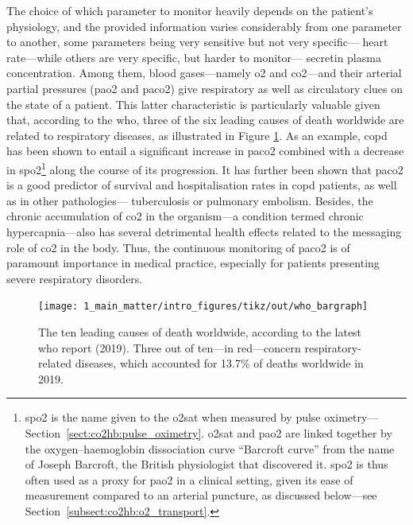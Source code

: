 
The choice of which parameter to monitor heavily depends on the patient's physiology, and the provided information varies considerably from one parameter to another, some parameters being very sensitive but not very specific---\eg{} heart rate---while others are very specific, but harder to monitor---\eg{} secretin plasma concentration. Among them, blood gases---namely \gls{o2} and \gls{co2}---and their arterial partial pressures (\gls{pao2} and \gls{paco2}) give respiratory as well as circulatory clues on the state of a patient\cite{wagner2015}. This latter characteristic is particularly valuable given that, according to the \gls{who}, three of the six leading causes of death worldwide are related to respiratory diseases, as illustrated in Figure \ref{fig:who_causes_death}. As an example, \gls{copd} has been shown to entail a significant increase in \gls{paco2} combined with a decrease in \gls{spo2}\footnote{\gls{spo2} is the name given to the \gls{o2sat} when measured by pulse oximetry---Section~\ref{sect:co2hb:pulse_oximetry}. \gls{o2sat} and \gls{pao2} are linked together by the oxygen–haemoglobin dissociation curve \aka{} \enquote{Barcroft curve} from the name of Joseph Barcroft, the British physiologist that discovered it\cite{barcroft1909}. \gls{spo2} is thus often used as a proxy for \gls{pao2} in a clinical setting, given its ease of measurement compared to an arterial puncture\cite{nitzan2014, jubran2015, tamura2019}, as discussed below---see Section~\ref{subsect:co2hb:o2_transport}.} along the course of its progression\cite{cukic2014, rajeh2016}. It has further been shown that \gls{paco2} is a good predictor of survival and hospitalisation rates in \gls{copd} patients\cite{nava1994, kessler1999, park2006}, as well as in other pathologies---\eg{} tuberculosis\cite{tsuboi2010} or pulmonary embolism\cite{ozsu2012}. Besides, the chronic accumulation of \gls{co2} in the organism---a condition termed chronic hypercapnia---also has several detrimental health effects related to the messaging role of \gls{co2} in the body\cite{vadasz2012, phelan2021, almanzahurtado2022}. Thus, the continuous monitoring of \gls{paco2} is of paramount importance in medical practice, especially for patients presenting severe respiratory disorders.

\begin{figure}
	\centering
	\texttt{[image: 1\_main\_matter/intro\_figures/tikz/out/who\_bargraph]}
	\caption[The ten leading causes of death according to the WHO.]{The ten leading causes of death worldwide, according to the latest \gls{who} report (2019)\cite{who_causes_death_2019}. Three out of ten---in red---concern respiratory-related diseases, which accounted for 13.7\% of deaths worldwide in 2019.}
	\label{fig:who_causes_death}
\end{figure}



